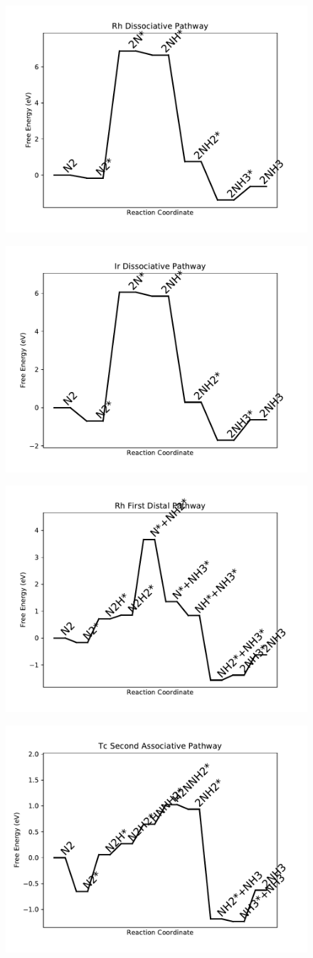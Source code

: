 \documentclass[journal=jacsat,manuscript=article]{achemso}
\begin{document}
\newpage
\begin{figure}
\includegraphics[width=0.5\linewidth]{data/plots/Rh_dissociative.pdf}
\label{fig:Rh_dissociative}
\end{figure}

\begin{figure}
\includegraphics[width=0.5\linewidth]{data/plots/Ir_dissociative.pdf}
\label{fig:Ir_dissociative}
\end{figure}

\newpage
\begin{figure}
\includegraphics[width=0.5\linewidth]{data/plots/Rh_distal_1.pdf}
\label{fig:Rh_distal_1}
\end{figure}

\begin{figure}
\includegraphics[width=0.5\linewidth]{data/plots/Tc_associative_2.pdf}
\label{fig:Tc_associative_2}
\end{figure}
\end{document}
